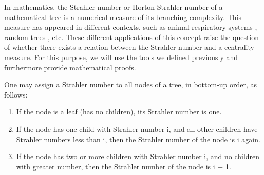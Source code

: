 

In mathematics, the Strahler number or Horton-Strahler number of a mathematical tree is a numerical measure of its branching complexity. This measure has appeared in different contexts, such as animal respiratory systems \cite{horsfield1976some}, random trees \cite{devroye1996horton}, etc. These different applications of this concept raise the question of whether there exists a relation between the Strahler number and a centrality measure. For this purpose, we will use the tools we defined previously and furthermore provide mathematical proofs.

\vspace*{0.5cm}

One may assign a Strahler number to all nodes of a tree, in bottom-up order, as follows:
\begin{enumerate}
\item 
If the node is a leaf (has no children), its Strahler number is one.
\item
If the node has one child with Strahler number i, and all other children have Strahler numbers less than i, then the Strahler number of the node is i again.
\item
If the node has two or more children with Strahler number i, and no children with greater number, then the Strahler number of the node is i + 1.
\end{enumerate}


